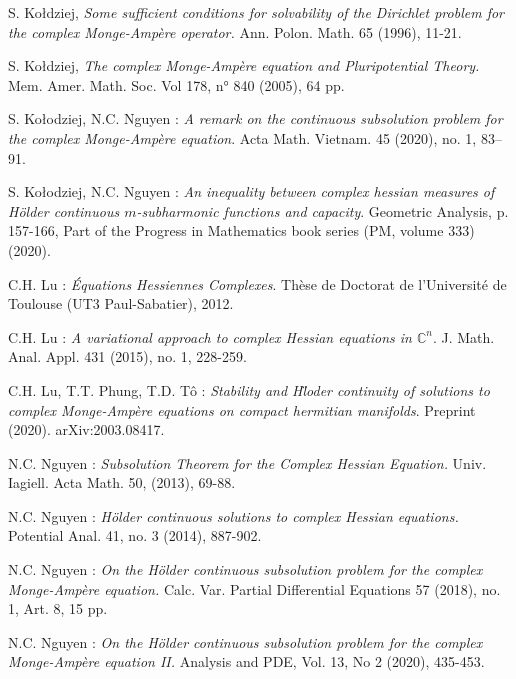 \documentclass[12pt]{amsart}
\theoremstyle{definition}
\numberwithin{theorem}{section}
\numberwithin{equation}{section}
\newcommand{\C}{\mathbb{C}}
\begin{document}
{\begin{thebibliography}{X-XX}
  S.  Ko\l dziej, {\it   Some sufficient conditions for solvability of the Dirichlet problem for the
complex Monge-Amp\`ere operator.}  Ann. Polon. Math. 65 (1996), 11-21.

 S.  Ko\l dziej, {\it The complex Monge-Amp\`ere equation and Pluripotential Theory.} Mem. Amer. Math. Soc. Vol 178, n° 840 (2005), 64 pp.
 
 
  S.  Ko\l odziej,  N.C. Nguyen : {\it   A remark on the continuous subsolution problem for the complex Monge-Amp\`ere equation}.   Acta Math. Vietnam. 45 (2020), no. 1, 83–91.

  S.  Ko\l odziej,  N.C. Nguyen : {\it An inequality between complex hessian measures of H\"older continuous $m$-subharmonic functions and capacity}. Geometric Analysis, p. 157-166, Part of the Progress in Mathematics book series (PM, volume 333)(2020).


  C.H. Lu : {\it \'Equations Hessiennes Complexes}. Th\`ese de Doctorat de l'Universit\'e de Toulouse (UT3 Paul-Sabatier), 2012.

 
    
  C.H. Lu : {\it A variational approach to complex Hessian equations in $\C^n$}. J. Math. Anal. Appl. 431 (2015), no. 1, 228-259.
  
  
  C.H. Lu, T.T. Phung, T.D. T\^o  : {\it Stability and H\"loder continuity of solutions to complex Monge-Amp\`ere equations on compact hermitian manifolds}. Preprint (2020).  arXiv:2003.08417. 

 {N.C. Nguyen} : {\it Subsolution Theorem for the Complex Hessian Equation.} Univ. Iagiell. Acta Math. 50, (2013), 69-88.

 N.C. Nguyen : {\it  H\"older continuous solutions to complex Hessian equations.} Potential Anal. 41, no. 3 (2014), 887-902.

 {N.C. Nguyen} : {\it On the H\"older continuous subsolution problem for the complex Monge-Amp\`ere equation.}  Calc. Var. Partial Differential Equations 57 (2018), no. 1, Art. 8, 15 pp.

 {N.C. Nguyen} : {\it On the H\"older continuous subsolution problem for the complex Monge-Amp\`ere equation II.}  Analysis and  PDE, Vol. 13, No 2 (2020), 435-453.


\end{thebibliography}}
\end{document}
